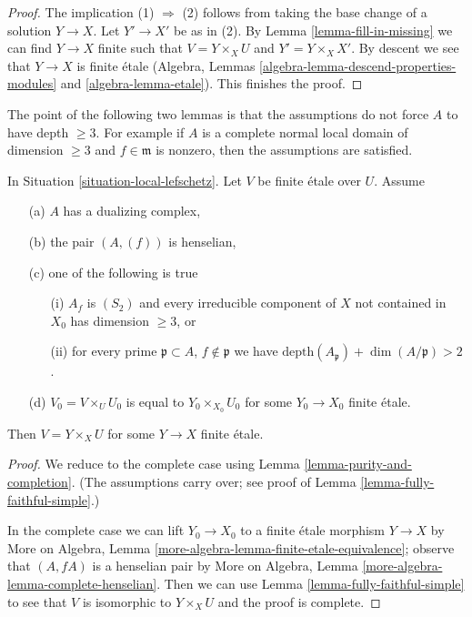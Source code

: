 \begin{proof}
The implication (1) $\Rightarrow$ (2) follows from taking the base change
of a solution $Y \to X$. Let $Y' \to X'$ be as in (2).
By Lemma \ref{lemma-fill-in-missing} we can find $Y \to X$ finite
such that $V = Y \times_X U$ and $Y' = Y \times_X X'$.
By descent we see that $Y \to X$ is finite \'etale
(Algebra, Lemmas \ref{algebra-lemma-descend-properties-modules} and
\ref{algebra-lemma-etale}). This finishes the proof.
\end{proof}

\noindent
The point of the following two lemmas is that the assumptions do not force
$A$ to have depth $\geq 3$. For example if $A$ is a complete normal
local domain of dimension $\geq 3$ and $f \in \mathfrak m$ is nonzero,
then the assumptions are satisfied.

\begin{lemma}
\label{lemma-lift-simple}
In Situation \ref{situation-local-lefschetz}. Let $V$ be finite
\'etale over $U$. Assume
\begin{enumerate}
\item[(a)] $A$ has a dualizing complex,
\item[(b)] the pair $(A, (f))$ is henselian,
\item[(c)] one of the following is true
\begin{enumerate}
\item[(i)] $A_f$ is $(S_2)$ and every irreducible component of $X$
not contained in $X_0$ has dimension $\geq 3$, or
\item[(ii)] for every prime $\mathfrak p \subset A$, $f \not \in \mathfrak p$
we have $\text{depth}(A_\mathfrak p) + \dim(A/\mathfrak p) > 2$.
\end{enumerate}
\item[(d)] $V_0 = V \times_U U_0$ is equal to $Y_0 \times_{X_0} U_0$
for some $Y_0 \to X_0$ finite \'etale.
\end{enumerate}
Then $V = Y \times_X U$ for some $Y \to X$ finite \'etale.
\end{lemma}

\begin{proof}
We reduce to the complete case using Lemma \ref{lemma-purity-and-completion}.
(The assumptions carry over; see proof of
Lemma \ref{lemma-fully-faithful-simple}.)

\medskip\noindent
In the complete case we can lift $Y_0 \to X_0$ to a finite \'etale
morphism $Y \to X$ by
More on Algebra, Lemma \ref{more-algebra-lemma-finite-etale-equivalence};
observe that $(A, fA)$ is a henselian pair by
More on Algebra, Lemma \ref{more-algebra-lemma-complete-henselian}.
Then we can use Lemma \ref{lemma-fully-faithful-simple}
to see that $V$ is isomorphic to $Y \times_X U$ and
the proof is complete.
\end{proof}

